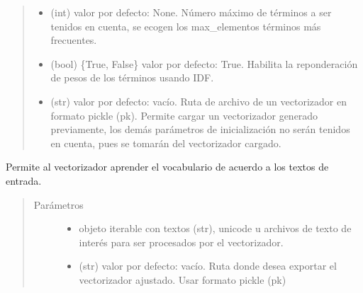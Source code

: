 \documentclass[letterpaper,10pt,openany,spanish]{sphinxmanual}
\begin{document}
\begin{fulllineitems}
\begin{quote}
\begin{description}
\begin{itemize}
\item {} 
 \textendash{} (int) valor por defecto: None. Número máximo 
de términos a ser tenidos en cuenta, se ecogen los max\_elementos  
términos más frecuentes.

\item {} 
 \textendash{} (bool) \{True, False\} valor por defecto: True. Habilita la 
reponderación de pesos de los términos usando IDF.

\item {} 
 \textendash{} (str) valor por defecto: vacío. Ruta de archivo 
de un vectorizador en formato pickle (pk). Permite cargar un 
vectorizador generado previamente, los demás parámetros de 
inicialización no serán tenidos en cuenta, pues se tomarán del 
vectorizador cargado.

\end{itemize}

\end{description}\end{quote}

\begin{fulllineitems}
\label{\detokenize{funciones/vectorizacion:vectorizacion.VectorizadorFrecuencias.ajustar}}
Permite al vectorizador aprender el vocabulario de acuerdo a 
los textos de entrada.
\begin{quote}\begin{description}
\item[{Parámetros}] \leavevmode\begin{itemize}
\item {} 
 \textendash{} objeto iterable con textos (str), unicode u archivos de 
texto de interés para ser procesados por el vectorizador.

\item {} 
 \textendash{} (str) valor por defecto: vacío. Ruta donde 
desea exportar el vectorizador ajustado. Usar formato pickle (pk)


\end{itemize}
\end{description}
\end{quote}
\end{fulllineitems}
\end{fulllineitems}
\end{document}
